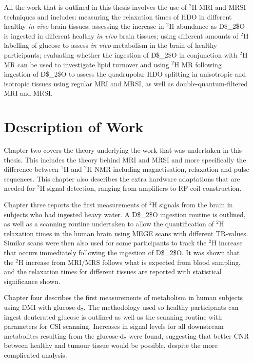 All the work that is outlined in this thesis involves the use of $^2$H \ac{MRI} and \ac{MRSI} techniques and includes: measuring the relaxation times of \ac{HDO} in different healthy \textit{in vivo} brain tissues; assessing the increase in $^2$H abundance as \Ac{D$_2$O} is ingested in different healthy \textit{in vivo} brain tissues; using different amounts of $^2$H labelling of glucose to assess \textit{in vivo} metabolism in the brain of healthy participants; evaluating whether the ingestion of \Ac{D$_2$O} in conjunction with $^2$H MR can be used to investigate lipid turnover and using $^2$H MR following ingestion of \Ac{D$_2$O} to assess the quadrupolar \ac{HDO} splitting in anisotropic and isotropic tissues using regular \ac{MRI} and \ac{MRSI}, as well as double-quantum-filtered \ac{MRI} and MRSI.

\section{Description of Work}

Chapter two covers the theory underlying the work that was undertaken in this thesis. This includes the theory behind \ac{MRI} and \ac{MRSI} and more specifically the difference between $^1$H and $^2$H \ac{NMR} including magnetisation, relaxation and pulse sequences. This chapter also describes the extra hardware adaptations that are needed for $^2$H signal detection, ranging from amplifiers to \ac{RF} coil construction.

Chapter three reports the first measurements of $^2$H signals from the brain in subjects who had ingested heavy water. A \ac{D$_2$O} ingestion routine is outlined, as well as a scanning routine undertaken to allow the quantification of $^2$H relaxation times in the human brain using \ac{MEGE} scans with different \ac{TR}-values. Similar scans were then also used for some participants to track the $^2$H increase that occurs immediately following the ingestion of \ac{D$_2$O}. It was shown that the $^2$H increase from \ac{MRI}/\ac{MRS} follows what is expected from blood sampling, and the relaxation times for different tissues are reported with statistical significance shown.


Chapter four describes the first measurements of metabolism in human subjects using \ac{DMI} with glucose-d$_7$. The methodology used so healthy participants can ingest deuterated glucose is outlined as well as the scanning routine with parameters for CSI scanning. Increases in signal levels for all downstream metabolites resulting from the glucose-d$_7$ were found, suggesting that better \ac{CNR} between healthy and tumour tissue would be possible, despite the more complicated analysis.

